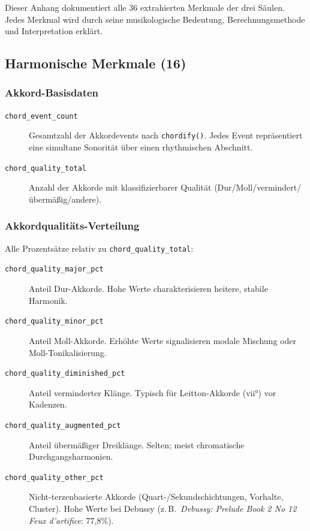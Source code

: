\documentclass[12pt,a4paper]{article}
\theoremstyle{definition}
\begin{document}
Dieser Anhang dokumentiert alle 36 extrahierten Merkmale der drei Säulen. Jedes Merkmal wird durch seine musikologische Bedeutung, Berechnungsmethode und Interpretation erklärt.

\subsection{Harmonische Merkmale (16)}

\subsubsection*{Akkord-Basisdaten}
\begin{description}
    \item[\texttt{chord\_event\_count}] Gesamtzahl der Akkordevents nach \texttt{chordify()}. Jedes Event repräsentiert eine simultane Sonorität über einen rhythmischen Abschnitt.
    
    \item[\texttt{chord\_quality\_total}] Anzahl der Akkorde mit klassifizierbarer Qualität (Dur/Moll/vermindert/übermäßig/andere).
\end{description}

\subsubsection*{Akkordqualitäts-Verteilung}
Alle Prozentsätze relativ zu \texttt{chord\_quality\_total}:
\begin{description}
    \item[\texttt{chord\_quality\_major\_pct}] Anteil Dur-Akkorde. Hohe Werte charakterisieren heitere, stabile Harmonik.
    
    \item[\texttt{chord\_quality\_minor\_pct}] Anteil Moll-Akkorde. Erhöhte Werte signalisieren modale Mischung oder Moll-Tonikalisierung.
    
    \item[\texttt{chord\_quality\_diminished\_pct}] Anteil verminderter Klänge. Typisch für Leitton-Akkorde (vii°) vor Kadenzen.
    
    \item[\texttt{chord\_quality\_augmented\_pct}] Anteil übermäßiger Dreiklänge. Selten; meist chromatische Durchgangsharmonien.
    
    \item[\texttt{chord\_quality\_other\_pct}] Nicht-terzenbasierte Akkorde (Quart-/Sekundschichtungen, Vorhalte, Cluster). Hohe Werte bei Debussy (z.\,B.\ \emph{Debussy: Prelude Book 2 No 12 Feux d'artifice}: 77{,}8\%).
\end{description}
\end{document}

